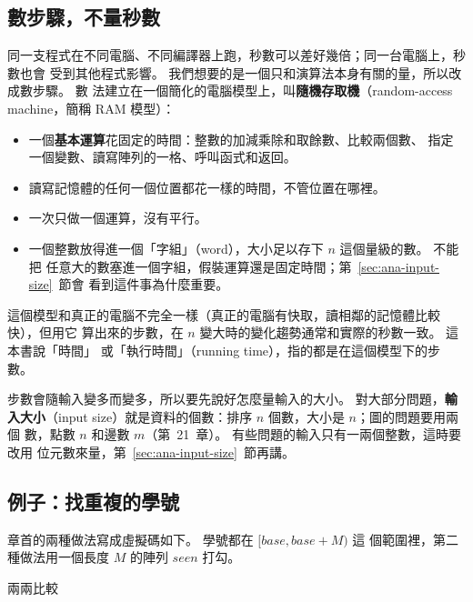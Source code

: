 \subsection{數步驟，不量秒數}

同一支程式在不同電腦、不同編譯器上跑，秒數可以差好幾倍；同一台電腦上，秒數也會
受到其他程式影響。 我們想要的是一個只和演算法本身有關的量，所以改成數步驟。 數
法建立在一個簡化的電腦模型上，叫\textbf{隨機存取機}（random-access machine，簡稱
RAM 模型）：

\begin{itemize}
\item 一個\textbf{基本運算}花固定的時間：整數的加減乘除和取餘數、比較兩個數、
指定一個變數、讀寫陣列的一格、呼叫函式和返回。
\item 讀寫記憶體的任何一個位置都花一樣的時間，不管位置在哪裡。
\item 一次只做一個運算，沒有平行。
\item 一個整數放得進一個「字組」（word），大小足以存下 $n$ 這個量級的數。 不能把
任意大的數塞進一個字組，假裝運算還是固定時間；第~\ref{sec:ana-input-size}~節會
看到這件事為什麼重要。
\end{itemize}

這個模型和真正的電腦不完全一樣（真正的電腦有快取，讀相鄰的記憶體比較快），但用它
算出來的步數，在 $n$ 變大時的變化趨勢通常和實際的秒數一致。 這本書說「時間」
或「執行時間」（running time），指的都是在這個模型下的步數。

步數會隨輸入變多而變多，所以要先說好怎麼量輸入的大小。 對大部分問題，\textbf{輸
入大小}（input size）就是資料的個數：排序 $n$ 個數，大小是 $n$；圖的問題要用兩個
數，點數 $n$ 和邊數 $m$（第~21~章）。 有些問題的輸入只有一兩個整數，這時要改用
位元數來量，第~\ref{sec:ana-input-size}~節再講。

\subsection{例子：找重複的學號}

章首的兩種做法寫成虛擬碼如下。 學號都在 $[\mathit{base}, \mathit{base} + M)$ 這
個範圍裡，第二種做法用一個長度 $M$ 的陣列 $\mathit{seen}$ 打勾。

\begin{pseudo}[label=alg:dup-pairs]{兩兩比較}
                \State \Return \TRUE
            \EndIf
        \EndFor
    \EndFor
    \State \Return \FALSE
\EndFunction
\end{pseudo}

